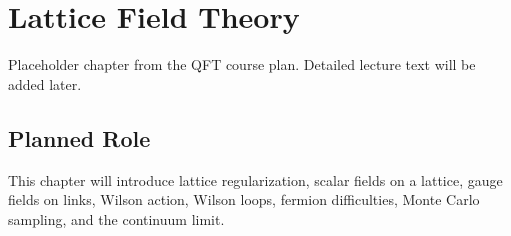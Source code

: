 \chapter{Lattice Field Theory}

\begin{remarkbox}
Placeholder chapter from the QFT course plan. Detailed lecture text will be added later.
\end{remarkbox}

\section{Planned Role}

This chapter will introduce lattice regularization, scalar fields on a lattice, gauge fields on links, Wilson action, Wilson loops, fermion difficulties, Monte Carlo sampling, and the continuum limit.
